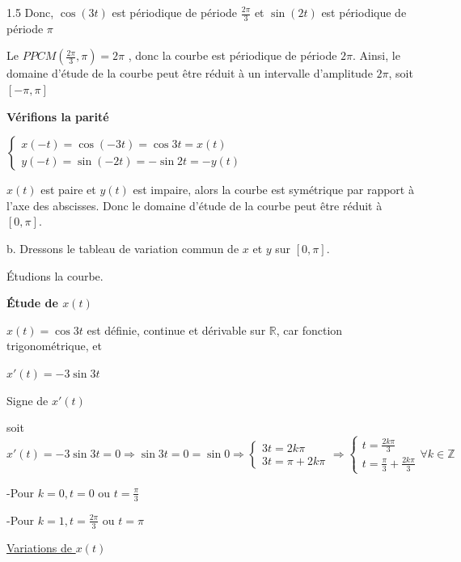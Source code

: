 \documentclass[12pt]{article}
\begin{document}
\begin{spacing}{1.5}
Donc, $\cos(3t)$ est périodique de période $\frac{2\pi}{3}$ et $\sin(2t)$ est périodique de période $\pi$

Le $PPCM(\frac{2\pi}{3},\pi)=2\pi$ , donc la courbe est périodique de période $2\pi$. Ainsi, le domaine d'étude de la courbe peut être réduit à un intervalle d'amplitude $2\pi$, soit $[-\pi,\pi]$

\medskip
\textbf{Vérifions la parité}

$\begin{cases}
x(-t)=\cos(-3t)=\cos 3t=x(t)\\
y(-t)=\sin(-2t)=-\sin 2t=-y(t)
\end{cases}$

$x(t)$ est paire et $y(t)$ est impaire, alors la courbe est symétrique par rapport à l'axe des abscisses. Donc le domaine d'étude de la courbe peut être réduit à $[0,\pi]$.

b. Dressons le tableau de variation commun de $x$ et $y$ sur $[0,\pi]$.

Étudions la courbe.

\textbf{Étude de $x(t)$}

$x(t)=\cos 3t$ est définie, continue et dérivable sur $\mathbb{R}$, car fonction trigonométrique, et

$x'(t)=-3\sin 3t$

\medskip
Signe de $x'(t)$

soit $x'(t)=-3\sin 3t=0\Rightarrow \sin 3t=0=\sin 0\Rightarrow \begin{cases}
3t=2k\pi\\
3t=\pi+2k\pi
\end{cases}\Rightarrow \begin{cases}
t=\frac{2k\pi}{3}\\
t=\frac{\pi}{3}+\frac{2k\pi}{3}
\end{cases}\forall k\in \mathbb{Z}$

-Pour $k=0, t=0$ ou $t=\frac{\pi}{3}$

-Pour $k=1,t=\frac{2\pi}{3}$ ou $t=\pi$



\underline{Variations de $x(t)$}


\end{spacing}
\end{document}
